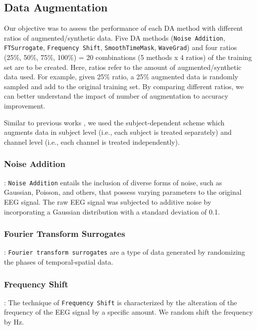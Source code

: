 \documentclass[runningheads]{llncs}
\begin{document}
\subsection{Data Augmentation}
Our objective was to assess the performance of each DA method with different ratios of augmented/synthetic data. Five DA methods (\texttt{Noise Addition}, \texttt{FTSurrogate}, \texttt{Frequency Shift}, \texttt{SmoothTimeMask}, \texttt{WaveGrad}) and four ratios (25\%, 50\%, 75\%, 100\%) = 20 combinations (5 methods x 4 ratios) of the training set are to be created.  Here, ratios refer to the amount of augmented/synthetic data used.  For example, given 25\% ratio, a 25\% augmented data is randomly sampled and add to the original training set.  By comparing different ratios, we can better understand the impact of number of augmentation to accuracy improvement.

\begin{sloppypar}
Similar to previous works \cite{rommel2021cadda,mohsenvand2020contrastive,leeb2008bci,terzano2001atlas}, we used the subject-dependent scheme which augments data in subject level (i.e., each subject is treated separately) and channel level (i.e., each channel is treated independently).
\end{sloppypar}

\subsubsection{Noise Addition}: \texttt{Noise Addition} entails the inclusion of diverse forms of noise, such as Gaussian, Poisson, and others, that possess varying parameters to the original EEG signal. The raw EEG signal was subjected to additive noise by incorporating a Gaussian distribution with a standard deviation of 0.1.

\subsubsection{Fourier Transform Surrogates}:
\texttt{Fourier transform surrogates} are a type of data generated by randomizing the phases of temporal-spatial data.


\subsubsection{Frequency Shift}: The technique of \texttt{Frequency Shift} is characterized by the alteration of the frequency of the EEG signal by a specific amount.
We random shift the frequency by  Hz.
\end{document}
